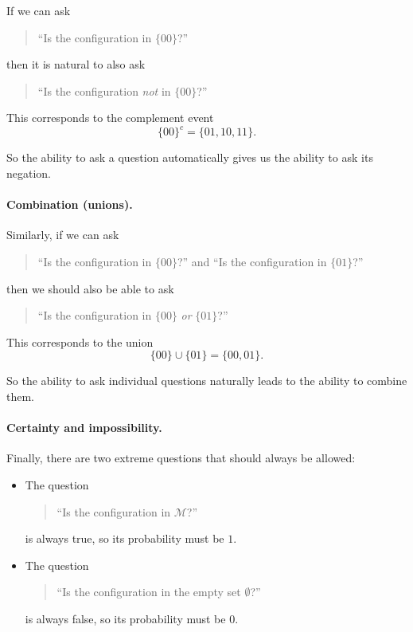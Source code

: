 \documentclass[11pt]{article}
\theoremstyle{remark}
\newcommand{\modelspace}{\mathcal{M}}
\begin{document}
If we can ask
\begin{quote}
``Is the configuration in \(\{00\}\)?''
\end{quote}
then it is natural to also ask
\begin{quote}
``Is the configuration \emph{not} in \(\{00\}\)?''
\end{quote}

This corresponds to the complement event
\[
\{00\}^c = \{01,10,11\}.
\]

So the ability to ask a question automatically gives us the ability to ask its negation.

\vspace{2mm}

\paragraph{Combination (unions).}

Similarly, if we can ask
\begin{quote}
``Is the configuration in \(\{00\}\)?'' \quad and \quad ``Is the configuration in \(\{01\}\)?''
\end{quote}
then we should also be able to ask
\begin{quote}
``Is the configuration in \(\{00\}\) \emph{or} \(\{01\}\)?''
\end{quote}

This corresponds to the union
\[
\{00\} \cup \{01\} = \{00,01\}.
\]

So the ability to ask individual questions naturally leads to the ability to combine them.

\vspace{2mm}

\paragraph{Certainty and impossibility.}

Finally, there are two extreme questions that should always be allowed:

\begin{itemize}
    \item The question
    \begin{quote}
    ``Is the configuration in \(\modelspace\)?''
    \end{quote}
    is always true, so its probability must be \(1\).

    \item The question
    \begin{quote}
    ``Is the configuration in the empty set \(\emptyset\)?''
    \end{quote}
    is always false, so its probability must be \(0\).
\end{itemize}
\end{document}
